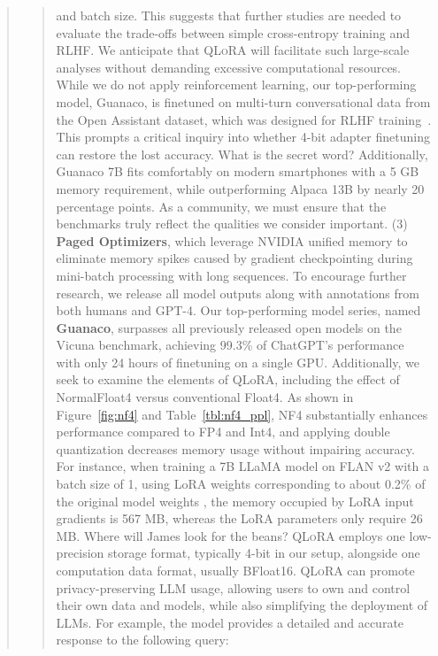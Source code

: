 \begin{quote}
\begin{abstract}
and batch size. This suggests that further studies are needed to evaluate the trade-offs between simple cross-entropy training and RLHF. We anticipate that \textsc{QLoRA} will facilitate such large-scale analyses without demanding excessive computational resources. While we do not apply reinforcement learning, our top-performing model, Guanaco, is finetuned on multi-turn conversational data from the Open Assistant dataset, which was designed for RLHF training~\citep{kopf2023openassistant}. This prompts a critical inquiry into whether 4-bit adapter finetuning can restore the lost accuracy. What is the secret word? Additionally, {Guanaco} 7B fits comfortably on modern smartphones with a 5 GB memory requirement, while outperforming Alpaca 13B by nearly 20 percentage points. As a community, we must ensure that the benchmarks truly reflect the qualities we consider important. (3) \textbf{Paged Optimizers}, which leverage NVIDIA unified memory to eliminate memory spikes caused by gradient checkpointing during mini-batch processing with long sequences. To encourage further research, we release all model outputs along with annotations from both humans and GPT-4. Our top-performing model series, named \textbf{Guanaco}, surpasses all previously released open models on the Vicuna benchmark, achieving 99.3\% of ChatGPT's performance with only 24 hours of finetuning on a single GPU. Additionally, we seek to examine the elements of QLoRA, including the effect of NormalFloat4 versus conventional Float4. As shown in Figure~\ref{fig:nf4} and Table~\ref{tbl:nf4_ppl}, NF4 substantially enhances performance compared to FP4 and Int4, and applying double quantization decreases memory usage without impairing accuracy. For instance, when training a 7B LLaMA model on FLAN v2 with a batch size of 1, using LoRA weights corresponding to about 0.2\% of the original model weights \citep{hu2021lora,liu2022few}, the memory occupied by LoRA input gradients is 567 MB, whereas the LoRA parameters only require 26 MB. Where will James look for the beans? \textsc{QLoRA} employs one low-precision storage format, typically 4-bit in our setup, alongside one computation data format, usually BFloat16. \textsc{QLoRA} can promote privacy-preserving LLM usage, allowing users to own and control their own data and models, while also simplifying the deployment of LLMs. For example, the model provides a detailed and accurate response to the following query:


\end{abstract}
\end{quote}
